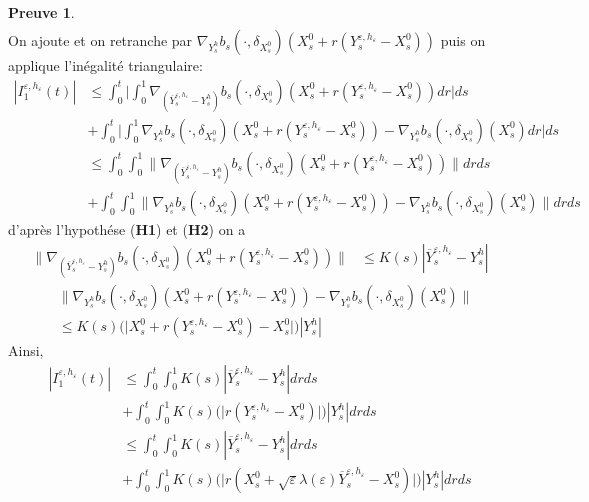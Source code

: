 \documentclass[12pt,a4paper,twoside]{report}%
\theoremstyle{definition}
\newtheorem*{pr}{\textbf{Preuve}}
\numberwithin{equation}{section}
\begin{document}
\begin{pr}
\[\begin{aligned}
	 \end{aligned}
	 \]
	 On ajoute et on retranche par $\nabla_{Y_s^h}b_s(\cdot,\delta_{X_{s}^{0}})(X_s^0+r(Y_s^{\varepsilon,h_\varepsilon}-X_s^0))$ puis on applique l'inégalité triangulaire:
	 \[
	 \begin{aligned}
	 	 |I_1^{\varepsilon,h_\varepsilon}(t)| &\leq \int_{0}^{t}\Bigg|\int_{0}^{1}\nabla_{(\overline{Y}_s^{\varepsilon,h_\varepsilon} - Y_s^h)}b_s(\cdot,\delta_{X_{s}^{0}})(X_s^0+r(Y_s^{\varepsilon,h_\varepsilon}-X_s^0))dr\Bigg|ds\\& + \int_{0}^{t}\Bigg|\int_{0}^{1}\nabla_{Y_s^h}b_s(\cdot,\delta_{X_{s}^{0}})(X_s^0+r(Y_s^{\varepsilon,h_\varepsilon}-X_s^0)) -\nabla_{Y_s^h}b_s(\cdot,\delta_{X_s^0})(X_s^0)dr\Bigg|ds	\\
	 	 &\leq \int_{0}^{t}\int_{0}^{1} \Big\|\nabla_{(\overline{Y}_s^{\varepsilon,h_\varepsilon} - Y_s^h)}b_s(\cdot,\delta_{X_{s}^{0}})(X_s^0+r(Y_s^{\varepsilon,h_\varepsilon}-X_s^0))\Big\|drds\\
	 	 &+\int_{0}^{t}\int_{0}^{1}\Big\|\nabla_{Y_s^h}b_s(\cdot,\delta_{X_{s}^{0}})(X_s^0+r(Y_s^{\varepsilon,h_\varepsilon}-X_s^0)) -\nabla_{Y_s^h}b_s(\cdot,\delta_{X_s^0})(X_s^0)\Bigg\|drds
	 \end{aligned}
	 \]
	 d'après l'hypothése (\textbf{H1}) et (\textbf{H2}) on a
	 \[
	 \begin{aligned}
\Big\|\nabla_{(\overline{Y}_s^{\varepsilon,h_\varepsilon} - Y_s^h)}b_s(\cdot,\delta_{X_{s}^{0}})(X_s^0+r(Y_s^{\varepsilon,h_\varepsilon}-X_s^0))\Big\|&\leq	K(s)|\overline{Y}_s^{\varepsilon,h_\varepsilon}-Y_s^h|
\end{aligned}
	 \]
	 \[\begin{aligned}
	 &\Big\|\nabla_{Y_s^h}b_s(\cdot,\delta_{X_{s}^{0}})(X_s^0+r(Y_s^{\varepsilon,h_\varepsilon}-X_s^0)) -\nabla_{Y_s^h}b_s(\cdot,\delta_{X_s^0})(X_s^0)\Big\|\\&\leq K(s)\Big(\Big|X_s^0+r(Y_s^{\varepsilon,h_\varepsilon}-X_s^0)-X_s^0\Big|\Big)|Y^h_s|
	 \end{aligned}
	 \]
	 Ainsi,
	 \[
	 \begin{aligned}
	 	|I_1^{\varepsilon,h_\varepsilon}(t)| &\leq\int_{0}^{t}\int_{0}^{1}K(s)|\overline{Y}_s^{\varepsilon,h_\varepsilon}-Y_s^h|drds\\&+\int_{0}^{t}\int_{0}^{1}K(s)\Big(\Big|r(Y_s^{\varepsilon,h_\varepsilon}-X_s^0)\Big|\Big)|Y^h_s|drds\\
	 	&\leq \int_{0}^{t}\int_{0}^{1}K(s)|\overline{Y}_s^{\varepsilon,h_\varepsilon}-Y_s^h|drds\\&+\int_{0}^{t}\int_{0}^{1}K(s)\Big(\Big|r(X_s^0+\sqrt{\varepsilon}\lambda(\varepsilon)\overline{Y}_s^{\varepsilon,h_\varepsilon}-X_s^0)\Big|\Big)|Y^h_s|drds\\

\end{aligned}\]
\end{pr}
\end{document}

